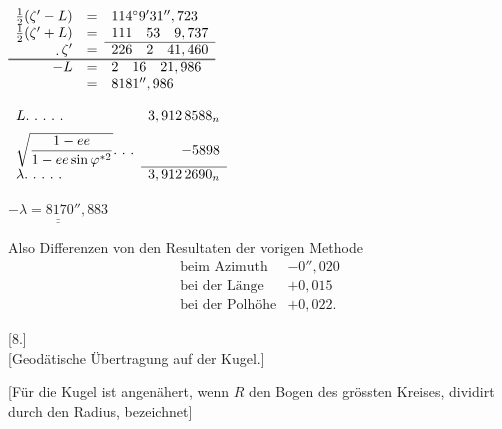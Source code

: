 \begin{minipage}[t]{.33\linewidth}\vspace{0pt}\centering
\(\begin{array}{rcl}
\tfrac12(\zeta'-L)&=&114^\circ9'31'',723\\
\tfrac12(\zeta'+L)&=&111\quad53\quad9,737\\\cline{3-3}
\mathord{\raisebox{-.2ex}{.}}\,\zeta'&=&226\quad2\quad41,460\\\cline{1-3}\noalign{\vskip .45pt}\cline{1-3}
-L&=&2\quad16\quad21,986\\
&=&8181'',986
\end{array}\)
\par\smallskip
\(\begin{array}{lr}
L\ldotp\,\ldotp\,\ldotp\,\ldotp\,\ldotp&3,912\,8588_n\\[1.3ex]
\displaystyle\sqrt{\frac{1-ee}{1-ee\sin\varphi^{*2}}}\ldotp\,\ldotp\,\ldotp&-5898\\\cline{2-2}
\lambda\ldotp\,\ldotp\,\ldotp\,\ldotp\,\ldotp&3,912\,2690_n
\end{array}\)
\par\smallskip
\(\underline{\underline{-\lambda=8170'',883}}\)
\end{minipage}
\par\medskip
Also Differenzen von den Resultaten der vorigen Methode
\[
\begin{array}{lr}
\text{beim Azimuth}&-0'',020\\
\text{bei der Länge}&+0,015\\
\text{bei der Polhöhe}&+0,022.
\end{array}
\]
\endgroup
\begin{center}[8.]\\[.5ex][Geodätische Übertragung auf der Kugel.]\end{center}
[Für die Kugel ist angenähert, wenn \(R\) den Bogen des grössten Kreises,
dividirt durch den Radius, bezeichnet]

